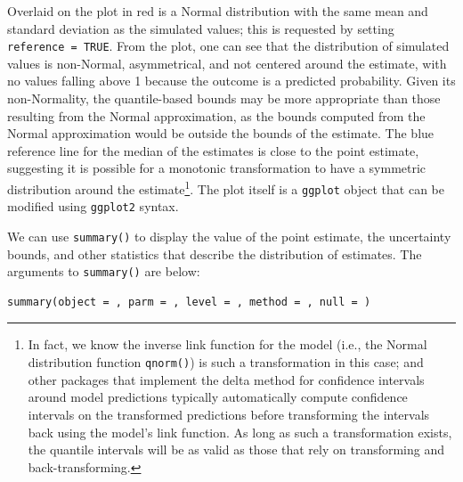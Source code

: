 Overlaid on the plot in red is a Normal distribution with the same mean and standard deviation as the simulated values; this is requested by setting \texttt{reference\ =\ TRUE}. From the plot, one can see that the distribution of simulated values is non-Normal, asymmetrical, and not centered around the estimate, with no values falling above 1 because the outcome is a predicted probability. Given its non-Normality, the quantile-based bounds may be more appropriate than those resulting from the Normal approximation, as the bounds computed from the Normal approximation would be outside the bounds of the estimate. The blue reference line for the median of the estimates is close to the point estimate, suggesting it is possible for a monotonic transformation to have a symmetric distribution around the estimate\footnote{In fact, we know the inverse link function for the model (i.e., the Normal distribution function \texttt{qnorm()}) is such a transformation in this case;  and other packages that implement the delta method for confidence intervals around model predictions typically automatically compute confidence intervals on the transformed predictions before transforming the intervals back using the model's link function. As long as such a transformation exists, the quantile intervals will be as valid as those that rely on transforming and back-transforming.}. The plot itself is a \texttt{ggplot} object that can be modified using \texttt{ggplot2} syntax.

We can use \texttt{summary()} to display the value of the point estimate, the uncertainty bounds, and other statistics that describe the distribution of estimates. The arguments to \texttt{summary()} are below:

\begin{verbatim}
summary(object = , parm = , level = , method = , null = )
\end{verbatim}

